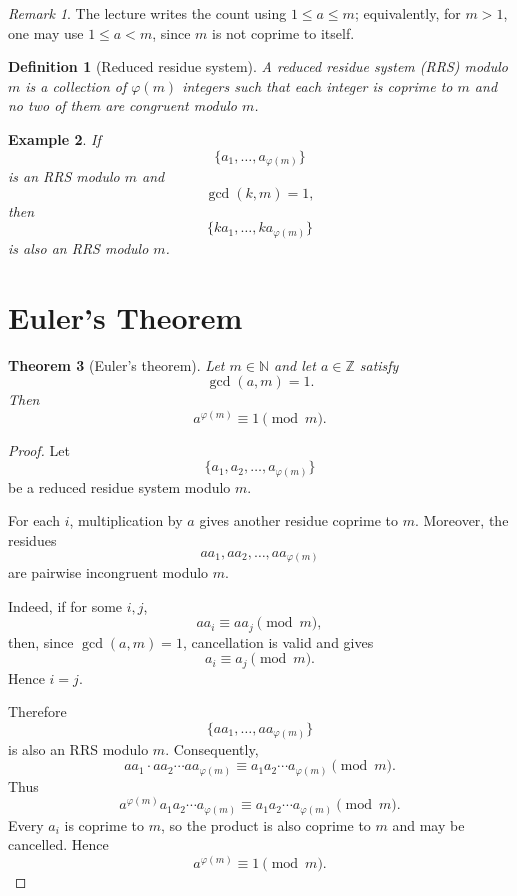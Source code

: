 \documentclass[11pt]{article}
\newtheorem{theorem}{Theorem}[section]
\newtheorem{definition}[theorem]{Definition}
\newtheorem{example}[theorem]{Example}
\theoremstyle{remark}
\newtheorem*{remark}{Remark}
\DeclareMathOperator{\gcdop}{gcd}
\newcommand{\Z}{\mathbb Z}
\newcommand{\N}{\mathbb N}
\newcommand{\phiE}{\varphi}
\begin{document}
\begin{remark}
The lecture writes the count using $1\le a\le m$; equivalently, for
$m>1$, one may use $1\le a<m$, since $m$ is not coprime to itself.
\end{remark}

\begin{definition}[Reduced residue system]
A \emph{reduced residue system} (RRS) modulo $m$ is a collection of
$\phiE(m)$ integers such that each integer is coprime to $m$ and no two
of them are congruent modulo $m$.
\end{definition}

\begin{example}
If
\[
    \{a_1,\ldots,a_{\phiE(m)}\}
\]
is an RRS modulo $m$ and
\[
    \gcdop(k,m)=1,
\]
then
\[
    \{ka_1,\ldots,ka_{\phiE(m)}\}
\]
is also an RRS modulo $m$.
\end{example}

\section{Euler's Theorem}

\begin{theorem}[Euler's theorem]
Let $m\in\N$ and let $a\in\Z$ satisfy
\[
    \gcdop(a,m)=1.
\]
Then
\[
    a^{\phiE(m)}\equiv1\pmod m.
\]
\end{theorem}

\begin{proof}
Let
\[
    \{a_1,a_2,\ldots,a_{\phiE(m)}\}
\]
be a reduced residue system modulo $m$.

For each $i$, multiplication by $a$ gives another residue coprime to $m$.
Moreover, the residues
\[
    aa_1,aa_2,\ldots,aa_{\phiE(m)}
\]
are pairwise incongruent modulo $m$.

Indeed, if for some $i,j$,
\[
    aa_i\equiv aa_j\pmod m,
\]
then, since $\gcdop(a,m)=1$, cancellation is valid and gives
\[
    a_i\equiv a_j\pmod m.
\]
Hence $i=j$.

Therefore
\[
    \{aa_1,\ldots,aa_{\phiE(m)}\}
\]
is also an RRS modulo $m$. Consequently,
\[
    aa_1\cdot aa_2\cdots aa_{\phiE(m)}
    \equiv
    a_1a_2\cdots a_{\phiE(m)}
    \pmod m.
\]
Thus
\[
    a^{\phiE(m)}
    a_1a_2\cdots a_{\phiE(m)}
    \equiv
    a_1a_2\cdots a_{\phiE(m)}
    \pmod m.
\]
Every $a_i$ is coprime to $m$, so the product is also coprime to $m$ and
may be cancelled. Hence
\[
    \boxed{a^{\phiE(m)}\equiv1\pmod m}.
\]
\end{proof}
\end{document}
